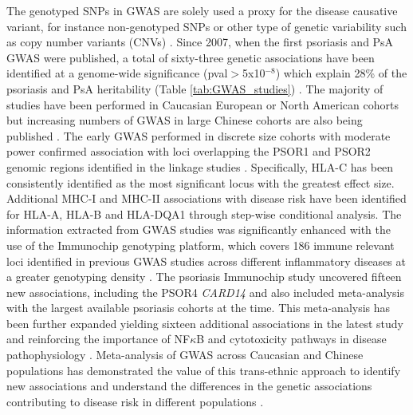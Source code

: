 The genotyped SNPs in GWAS are solely used a proxy for the disease causative variant, for instance non-genotyped SNPs or other type of genetic variability such as copy number variants (CNVs) \parencite{Hirschhorn2005, Ku2010}.
Since 2007, when the first psoriasis and PsA GWAS were published, a total of sixty-three genetic associations have been identified at a genome-wide significance (pval$>$5x10$^{-8}$) which explain 28\% of the psoriasis and PsA heritability (Table \ref{tab:GWAS_studies}) \parencite{Tsoi2017}. The majority of studies have been performed in Caucasian European or North American cohorts but increasing numbers of GWAS in large Chinese cohorts are also being published \parencite{Zhang2009, Sun2010, Yin2015}. The early GWAS performed in discrete size cohorts with moderate power confirmed association with loci overlapping the PSOR1 and PSOR2 genomic regions identified in the linkage studies \parencite{Cargill2007,Strange2010}. Specifically, HLA-C has been consistently identified as the most significant locus with the greatest effect size. Additional MHC-I and MHC-II associations with disease risk have been identified for HLA-A, HLA-B and HLA-DQA1 through step-wise conditional analysis\parencite{Okada2014}. 
The information extracted from GWAS studies was significantly enhanced with the use of the Immunochip genotyping platform, which covers 186 immune relevant loci identified in previous GWAS studies across different inflammatory diseases at a greater genotyping density \parencite{Tsoi2012}. The psoriasis Immunochip study uncovered fifteen new associations, including the PSOR4 \textit{CARD14} and also included meta-analysis with the largest available psoriasis cohorts at the time\parencite{Tsoi2012}. This meta-analysis has been further expanded yielding sixteen additional associations in the latest study and reinforcing the importance of NF$\kappa$B and cytotoxicity pathways in disease pathophysiology \parencite{Tsoi2015,Tsoi2017}. Meta-analysis of GWAS across Caucasian and Chinese populations has demonstrated the value of this trans-ethnic approach to identify new associations and understand the differences in the genetic associations contributing to disease risk in different populations \parencite{Yin2015}. 
